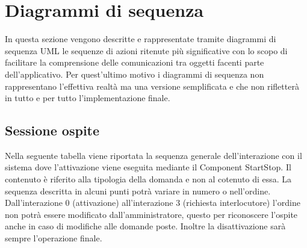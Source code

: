 \documentclass[../DefinizioneDiProdotto.tex]{subfiles}
\begin{document}
\section{Diagrammi di sequenza}
	In questa sezione vengono descritte e rappresentate tramite diagrammi di sequenza UML le sequenze di azioni ritenute più significative con lo scopo di facilitare la comprensione delle comunicazioni tra oggetti facenti parte dell'applicativo. Per quest'ultimo motivo i diagrammi di sequenza non rappresentano l'effettiva realtà ma una versione semplificata e che non rifletterà in tutto e per tutto l'implementazione finale.

	\subsection{Sessione ospite}
	Nella seguente tabella viene riportata la sequenza generale dell'interazione con il sistema dove l'attivazione viene eseguita mediante il Component StartStop. Il contenuto è riferito alla tipologia della domanda e non al cotenuto di essa. La sequenza descritta in alcuni punti potrà variare in numero o nell'ordine. Dall'interazione 0 (attivazione) all'interazione 3 (richiesta interlocutore) l'ordine non potrà essere modificato dall'amministratore, questo per riconoscere l'ospite anche in caso di modifiche alle domande poste. Inoltre la disattivazione sarà sempre l'operazione finale.
\end{document}
